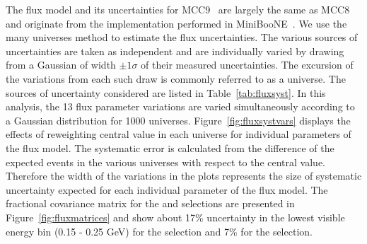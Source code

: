 The flux model and its uncertainties for MCC9~\cite{bib:fluxmcc9,bib:fluxtechnote} are largely the same as MCC8~\cite{bib:fluxtechnote} and originate from the implementation performed in MiniBooNE~\cite{bib:MBflux}. We use the many universes method to estimate the flux uncertainties. The various sources of uncertainties are taken as independent and  are individually varied by drawing from a Gaussian of width $\pm 1 \sigma$ of their measured uncertainties. The excursion of the variations from each such draw is commonly referred to as a universe. The sources of uncertainty considered are listed in Table~\ref{tab:fluxsyst}. In this analysis, the 13 flux parameter variations are varied simultaneously according to a Gaussian distribution for 1000 universes.
Figure~\ref{fig:fluxsystvars} displays the effects of reweighting central value in each universe for individual parameters of the flux model. The systematic error is calculated from the difference of the expected events in the various universes with respect to the central value. Therefore the width of the variations in the plots represents the size of systematic uncertainty expected for each individual parameter of the flux model.
The fractional covariance matrix for the \npsel and \zpsel selections are presented in Figure~\ref{fig:fluxmatrices} and show about 17\% uncertainty in the lowest visible energy bin (0.15 - 0.25 GeV) for the \npsel selection and 7\% for the \zpsel selection. %

